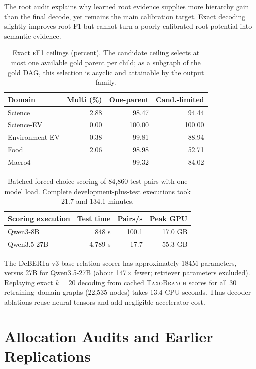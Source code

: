 \documentclass[11pt]{article}
\newcommand{\method}{\textsc{TaxoBranch}}
\newcommand{\ef}{\textsc{eF1}}
\begin{document}
The root audit explains why learned root evidence supplies more hierarchy gain
than the final decode, yet remains the main calibration target. Exact
decoding slightly improves root F1 but cannot turn a poorly calibrated root
potential into semantic evidence.

\begin{table}[h]
\centering
\scriptsize
\setlength{\tabcolsep}{3pt}
\begin{tabular}{lrrr}
\toprule
Domain & Multi (\%) & One-parent & Cand.-limited\\
\midrule
Science & 2.88 & 98.47 & 94.44\\
Science-EV & 0.00 & 100.00 & 100.00\\
Environment-EV & 0.38 & 99.81 & 88.94\\
Food & 2.06 & 98.98 & 52.71\\
\midrule
Macro4 & -- & 99.32 & 84.02\\
\bottomrule
\end{tabular}
\caption{Exact \ef{} ceilings (percent). The candidate ceiling selects at most
one available gold parent per child; as a subgraph of the gold DAG, this
selection is acyclic and attainable by the output family.}
\label{tab:ceilings}
\end{table}

\begin{table}[h]
\centering
\small
\begin{tabular}{lrrr}
\toprule
Scoring execution & Test time & Pairs/s & Peak GPU\\
\midrule
Qwen3-8B & 848 s & 100.1 & 17.0 GB\\
Qwen3.5-27B & 4,789 s & 17.7 & 55.3 GB\\
\bottomrule
\end{tabular}
\caption{Batched forced-choice scoring of 84,860 test pairs with one model load.
Complete development-plus-test executions took 21.7 and 134.1 minutes.}
\label{tab:efficiency}
\end{table}

The DeBERTa-v3-base relation scorer has approximately 184M parameters, versus
27B for Qwen3.5-27B (about 147$\times$ fewer; retriever parameters excluded).
Replaying exact $k=20$ decoding from cached \method{} scores for all 30
retraining--domain graphs (22,535 nodes) takes 13.4 CPU seconds. Thus decoder
ablations reuse neural tensors and add negligible accelerator cost.

\section{Allocation Audits and Earlier Replications}
\label{app:allocation-audits}
\end{document}
